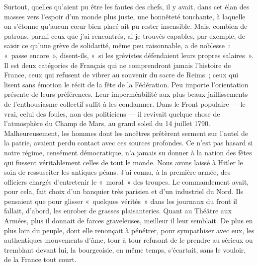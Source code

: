 \documentclass[french,twoside]{book} %
\begin{document}
Surtout, quelles qu’aient pu être les fautes des chefs, il y avait, dans cet élan des masses vers l’espoir d’un monde plus juste, une honnêteté touchante, à laquelle on s’étonne qu’aucun cœur bien placé ait pu rester insensible. Mais, combien de patrons, parmi ceux que j’ai rencontrés, ai-je trouvés capables, par exemple, de saisir ce qu’une grève de solidarité, même peu raisonnable, a de noblesse : « passe encore », disent-ils, « si les grévistes défendaient leurs propres salaires ». Il est deux catégories de Français qui ne comprendront jamais l’histoire de France, ceux qui refusent de vibrer au souvenir du sacre de Reims ; ceux qui lisent sans émotion le récit de la fête de la Fédération. Peu importe l’orientation présente de leurs préférences. Leur imperméabilité aux plus beaux jaillissements de l’enthousiasme collectif suffit à les condamner. Dans le Front populaire — le vrai, celui des foules, non des politiciens — il revivait quelque chose de l’atmosphère du Champ de Mars, au grand soleil du 14 juillet 1790. Malheureusement, les hommes dont les ancêtres prêtèrent serment sur l’autel de la patrie, avaient perdu contact avec ces sources profondes. Ce n’est pas hasard si notre régime, censément démocratique, n’a jamais su donner à la nation des fêtes qui fussent véritablement celles de tout le monde. Nous avons laissé à Hitler le soin de ressusciter les antiques péans. J’ai connu, à la première armée, des officiers chargés d’entretenir le « moral » des troupes. Le commandement avait, pour cela, fait choix d’un banquier très parisien et d’un industriel du Nord. Ils pensaient que pour glisser « quelques vérités » dans les journaux du front il fallait, d’abord, les enrober de grasses plaisanteries.   Quant au Théâtre aux Armées, plus il donnait de farces graveleuses, meilleur il leur semblait. De plus en plus loin du peuple, dont elle renonçait à pénétrer, pour sympathiser avec eux, les authentiques mouvements d’âme, tour à tour refusant de le prendre au sérieux ou tremblant devant lui, la bourgeoisie, en même temps, s’écartait, sans le vouloir, de la France tout court.\par
\end{document}
